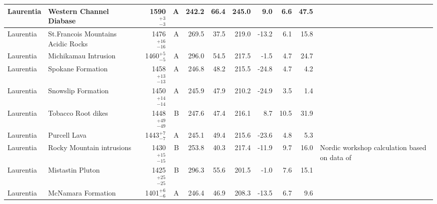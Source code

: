 \begin{ThreePartTable}
\begin{longtable}{p{1.4 in}p{1.2 in}rrrrrrrrp{1.2 in}}
                     Laurentia &                            Western Channel Diabase &     1590$^{+3}_{-3}$ &      A &     242.2 &      66.4 & 245.0 &   9.0 &       6.6 &        47.5 &                                 \cite{Irving1972a} \\ \hline
                     Laurentia &                 St.Francois Mountains Acidic Rocks &   1476$^{+16}_{-16}$ &      A &     269.5 &      37.5 & 219.0 & -13.2 &       6.1 &        15.8 &                                  \cite{Meert2002b} \\ \hline
                     Laurentia &                               Michikamau Intrusion &     1460$^{+5}_{-5}$ &      A &     296.0 &      54.5 & 217.5 &  -1.5 &       4.7 &        24.7 &                                 \cite{Emslie1976a} \\ \hline
                     Laurentia &                                  Spokane Formation &   1458$^{+13}_{-13}$ &      A &     246.8 &      48.2 & 215.5 & -24.8 &       4.7 &         4.2 &                                 \cite{Elston2002a} \\ \hline
                     Laurentia &                                 Snowslip Formation &   1450$^{+14}_{-14}$ &      A &     245.9 &      47.9 & 210.2 & -24.9 &       3.5 &         1.4 &                                 \cite{Elston2002a} \\ \hline
                     Laurentia &                                 Tobacco Root dikes &   1448$^{+49}_{-49}$ &      B &     247.6 &      47.4 & 216.1 &   8.7 &      10.5 &        31.9 &                                 \cite{Harlan2008a} \\ \hline
                     Laurentia &                                       Purcell Lava &     1443$^{+7}_{-7}$ &      A &     245.1 &      49.4 & 215.6 & -23.6 &       4.8 &         5.3 &                                 \cite{Elston2002a} \\ \hline
                     Laurentia &                          Rocky Mountain intrusions &   1430$^{+15}_{-15}$ &      B &     253.8 &      40.3 & 217.4 & -11.9 &       9.7 &        16.0 &  Nordic workshop calculation based on data of \cite{Harlan1994a,Harlan1998a} \\ \hline
                     Laurentia &                                   Mistastin Pluton &   1425$^{+25}_{-25}$ &      B &     296.3 &      55.6 & 201.5 &  -1.0 &       7.6 &        15.1 &                                 \cite{Fahrig1976a} \\ \hline
                     Laurentia &                                 McNamara Formation &     1401$^{+6}_{-6}$ &      A &     246.4 &      46.9 & 208.3 & -13.5 &       6.7 &         9.6 &                                 \cite{Elston2002a} \\ \hline

\end{longtable}
\end{ThreePartTable}

